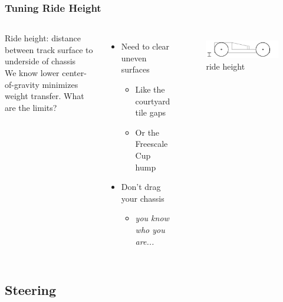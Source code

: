 \documentclass{beamer}
\begin{document}
\begin{frame}
\frametitle{Tuning Ride Height}
\begin{columns}[t]
  Ride height: distance between track surface to underside of chassis \\
  \vspace{\baselineskip}
  We know lower center-of-gravity minimizes weight transfer. What are the limits?
   {
  \begin{itemize}
    \item Need to clear uneven surfaces
    \begin{itemize}
      \item Like the courtyard tile gaps
      \item Or the Freescale Cup hump
    \end{itemize}
    \item Don't drag your chassis
    \begin{itemize}
      \item \textit{you know who you are...}
    \end{itemize}
  \end{itemize}
  }
  \begin{figure}
    \centering
    \includegraphics[width=1.0\columnwidth]{images-dis12/car-side-rideheight} \\
    ride height
  \end{figure}
\end{columns}
\end{frame}

\subsection{Steering}
\end{document}
